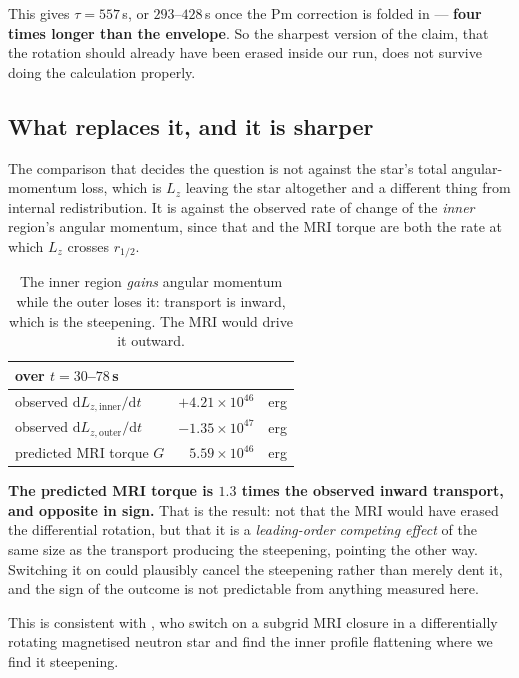 \documentclass[11pt,a4paper]{article}
\newcommand{\Pm}{\mathrm{Pm}}
\begin{document}
This gives $\tau = 557$\,s, or $293$--$428$\,s once the $\Pm$ correction is
folded in --- \textbf{four times longer than the envelope}. So the sharpest
version of the claim, that the rotation should already have been erased inside
our run, does not survive doing the calculation properly.

\subsection{What replaces it, and it is sharper}

The comparison that decides the question is not against the star's total
angular-momentum loss, which is $L_z$ leaving the star altogether and a
different thing from internal redistribution. It is against the observed rate
of change of the \emph{inner} region's angular momentum, since that and the MRI
torque are both the rate at which $L_z$ crosses $r_{1/2}$.

\begin{table}[h]
\centering\small
\begin{tabular}{lrr}
\toprule
over $t = 30$--$78$\,s & & \\
\midrule
observed $\mathrm{d}L_{z,\mathrm{inner}}/\mathrm{d}t$ & $+4.21\times10^{46}$ & erg \\
observed $\mathrm{d}L_{z,\mathrm{outer}}/\mathrm{d}t$ & $-1.35\times10^{47}$ & erg \\
\midrule
predicted MRI torque $G$ & $5.59\times10^{46}$ & erg \\
\bottomrule
\end{tabular}
\caption{The inner region \emph{gains} angular momentum while the outer loses
it: transport is inward, which is the steepening. The MRI would drive it
outward.}
\label{tab:torque}
\end{table}

\textbf{The predicted MRI torque is $1.3$ times the observed inward transport,
and opposite in sign.} That is the result: not that the MRI would have erased
the differential rotation, but that it is a \emph{leading-order competing
effect} of the same size as the transport producing the steepening, pointing
the other way. Switching it on could plausibly cancel the steepening rather
than merely dent it, and the sign of the outcome is not predictable from
anything measured here.

This is consistent with \citet{miravet2025}, who switch on a subgrid MRI
closure in a differentially rotating magnetised neutron star and find the inner
profile flattening where we find it steepening.
\end{document}
